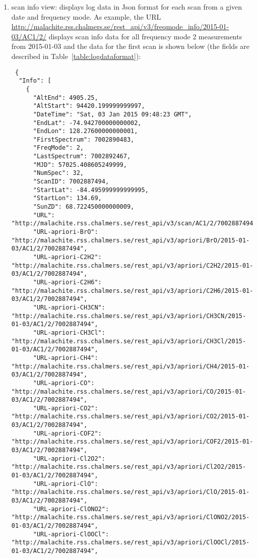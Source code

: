 \begin{enumerate}
\item scan info view: displays log data in Json format for each scan from a given date and frequency mode. 
  As example, the URL \url{http://malachite.rss.chalmers.se/rest_api/v3/freqmode_info/2015-01-03/AC1/2/}
  displays scan info data for all frequency mode 2 measurements from 2015-01-03 
  and the data for the first scan is shown below (the fields are 
   described in Table~\ref{table:logdataformat}):
\begin{tiny}
 \begin{verbatim}
 {
  "Info": [
    {
      "AltEnd": 4905.25, 
      "AltStart": 94420.199999999997, 
      "DateTime": "Sat, 03 Jan 2015 09:48:23 GMT", 
      "EndLat": -74.942700000000002, 
      "EndLon": 128.27600000000001, 
      "FirstSpectrum": 7002890483, 
      "FreqMode": 2, 
      "LastSpectrum": 7002892467, 
      "MJD": 57025.408605249999, 
      "NumSpec": 32, 
      "ScanID": 7002887494, 
      "StartLat": -84.495999999999995, 
      "StartLon": 134.69, 
      "SunZD": 68.722450000000009, 
      "URL": "http://malachite.rss.chalmers.se/rest_api/v3/scan/AC1/2/7002887494", 
      "URL-apriori-BrO": "http://malachite.rss.chalmers.se/rest_api/v3/apriori/BrO/2015-01-03/AC1/2/7002887494", 
      "URL-apriori-C2H2": "http://malachite.rss.chalmers.se/rest_api/v3/apriori/C2H2/2015-01-03/AC1/2/7002887494", 
      "URL-apriori-C2H6": "http://malachite.rss.chalmers.se/rest_api/v3/apriori/C2H6/2015-01-03/AC1/2/7002887494", 
      "URL-apriori-CH3CN": "http://malachite.rss.chalmers.se/rest_api/v3/apriori/CH3CN/2015-01-03/AC1/2/7002887494", 
      "URL-apriori-CH3Cl": "http://malachite.rss.chalmers.se/rest_api/v3/apriori/CH3Cl/2015-01-03/AC1/2/7002887494", 
      "URL-apriori-CH4": "http://malachite.rss.chalmers.se/rest_api/v3/apriori/CH4/2015-01-03/AC1/2/7002887494", 
      "URL-apriori-CO": "http://malachite.rss.chalmers.se/rest_api/v3/apriori/CO/2015-01-03/AC1/2/7002887494", 
      "URL-apriori-CO2": "http://malachite.rss.chalmers.se/rest_api/v3/apriori/CO2/2015-01-03/AC1/2/7002887494", 
      "URL-apriori-COF2": "http://malachite.rss.chalmers.se/rest_api/v3/apriori/COF2/2015-01-03/AC1/2/7002887494", 
      "URL-apriori-Cl2O2": "http://malachite.rss.chalmers.se/rest_api/v3/apriori/Cl2O2/2015-01-03/AC1/2/7002887494", 
      "URL-apriori-ClO": "http://malachite.rss.chalmers.se/rest_api/v3/apriori/ClO/2015-01-03/AC1/2/7002887494", 
      "URL-apriori-ClONO2": "http://malachite.rss.chalmers.se/rest_api/v3/apriori/ClONO2/2015-01-03/AC1/2/7002887494", 
      "URL-apriori-ClOOCl": "http://malachite.rss.chalmers.se/rest_api/v3/apriori/ClOOCl/2015-01-03/AC1/2/7002887494", 

\end{verbatim}
\end{tiny}
\end{enumerate}
